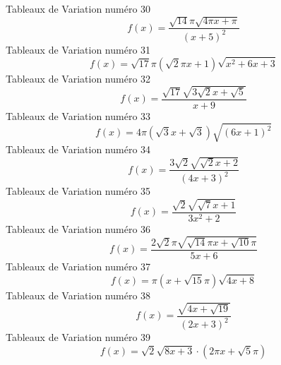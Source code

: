 \documentclass{article}
\begin{document}
\]Tableaux de Variation num\'ero 30 \[f(x) = \frac{\sqrt{14} \pi \sqrt{4 \pi x + \pi}}{\left(x + 5\right)^{2}}\]Tableaux de Variation num\'ero 31 \[f(x) = \sqrt{17} \pi \left(\sqrt{2} \pi x + 1\right) \sqrt{x^{2} + 6 x + 3}\]Tableaux de Variation num\'ero 32 \[f(x) = \frac{\sqrt{17} \sqrt{3 \sqrt{2} x + \sqrt{5}}}{x + 9}\]Tableaux de Variation num\'ero 33 \[f(x) = 4 \pi \left(\sqrt{3} x + \sqrt{3}\right) \sqrt{\left(6 x + 1\right)^{2}}\]Tableaux de Variation num\'ero 34 \[f(x) = \frac{3 \sqrt{2} \sqrt{\sqrt{2} x + 2}}{\left(4 x + 3\right)^{2}}\]Tableaux de Variation num\'ero 35 \[f(x) = \frac{\sqrt{2} \sqrt{\sqrt{7} x + 1}}{3 x^{2} + 2}\]Tableaux de Variation num\'ero 36 \[f(x) = \frac{2 \sqrt{2} \pi \sqrt{\sqrt{14} \pi x + \sqrt{10} \pi}}{5 x + 6}\]Tableaux de Variation num\'ero 37 \[f(x) = \pi \left(x + \sqrt{15} \pi\right) \sqrt{4 x + 8}\]Tableaux de Variation num\'ero 38 \[f(x) = \frac{\sqrt{4 x + \sqrt{19}}}{\left(2 x + 3\right)^{2}}\]Tableaux de Variation num\'ero 39 \[f(x) = \sqrt{2} \sqrt{8 x + 3} \cdot \left(2 \pi x + \sqrt{5} \pi\right)\]
\end{document}

